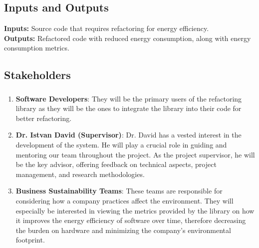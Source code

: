 \documentclass{article}
\begin{document}
\subsection{Inputs and Outputs}

\textbf{Inputs:} Source code that requires refactoring for energy efficiency. \\
\textbf{Outputs:} Refactored code with reduced energy consumption,
along with energy consumption metrics.

\subsection{Stakeholders}
\subsubsection*{\color{blue}{Direct Stakeholders}}
\begin{enumerate}

  \item \textbf{Software Developers}: They will be the primary users
    of the refactoring library as they will be the ones to integrate
    the library into their
    code for better refactoring.
  \item \textbf{Dr. Istvan David (Supervisor)}: Dr. David has a
    vested interest in the development of the system. He will play a
    crucial role in guiding and mentoring our
    team throughout the project. As the project supervisor, he will
    be the key advisor, offering feedback on technical aspects,
    project management, and research methodologies.
  \item \textbf{Business Sustainability Teams}: These teams are
    responsible for considering how a company practices affect the
    environment. They will especially be interested
    in viewing the metrics provided by the library on how it improves
    the energy efficiency of software over time, therefore decreasing
    the burden on hardware and minimizing the
    company's environmental footprint.

\end{enumerate}
\end{document}
